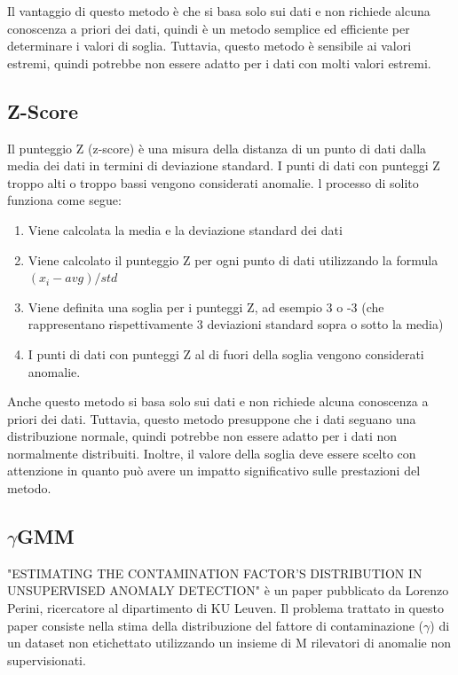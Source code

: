 Il vantaggio di questo metodo è che si basa solo sui dati e non richiede alcuna conoscenza a priori dei dati, quindi è un metodo semplice ed efficiente per determinare i valori di soglia. Tuttavia, questo metodo è sensibile ai valori estremi, quindi potrebbe non essere adatto per i dati con molti valori estremi.

\subsection{Z-Score}
Il punteggio Z (z-score) \cite{Bagdonavi_ius_2020} è una misura della distanza di un punto di dati dalla media dei dati in termini di deviazione standard. I punti di dati con punteggi Z troppo alti o troppo bassi vengono considerati anomalie.
l processo di solito funziona come segue:
\begin{enumerate}
\item Viene calcolata la media e la deviazione standard dei dati
\item Viene calcolato il punteggio Z per ogni punto di dati utilizzando la formula $(x_i - avg) / std$
\item Viene definita una soglia per i punteggi Z, ad esempio 3 o -3 (che rappresentano rispettivamente 3 deviazioni standard sopra o sotto la media)
\item I punti di dati con punteggi Z al di fuori della soglia vengono considerati anomalie.
\end{enumerate}
Anche questo metodo si basa solo sui dati e non richiede alcuna conoscenza a priori dei dati. Tuttavia, questo metodo presuppone che i dati seguano una distribuzione normale, quindi potrebbe non essere adatto per i dati non normalmente distribuiti. Inoltre, il valore della soglia deve essere scelto con attenzione in quanto può avere un impatto significativo sulle prestazioni del metodo.


\subsection{\texorpdfstring{$\gamma$}-GMM}
"ESTIMATING THE CONTAMINATION FACTOR’S DISTRIBUTION IN UNSUPERVISED ANOMALY DETECTION" \cite{https://doi.org/10.48550/arxiv.2210.10487} è un paper pubblicato da Lorenzo Perini, ricercatore al dipartimento di KU Leuven.
Il problema trattato in questo paper consiste nella stima della distribuzione del fattore di contaminazione ($\gamma$) di un dataset non etichettato utilizzando un insieme di M rilevatori di anomalie non supervisionati. 

